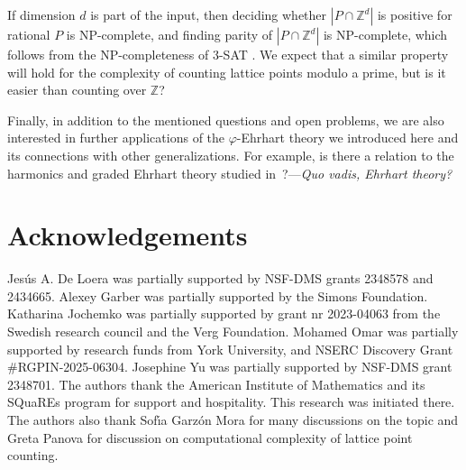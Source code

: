 \documentclass[12pt,reqno]{amsart}
\theoremstyle{definition}
\theoremstyle{remark}
\newcommand{\Z}{\mathbb{Z}}
\renewcommand{\phi}{\varphi}
\begin{document}
If dimension $d$ is part of the input, then deciding whether $|P\cap \Z^d|$ is positive for rational $P$ is NP-complete, and finding parity of $|P\cap \Z^d|$ is NP-complete, which follows from the NP-completeness of 3-SAT \cite{karp}. We expect that a similar property will hold for the complexity of counting lattice points modulo a prime, but is it easier than counting over $\mathbb{Z}$? 

Finally, in addition to the mentioned questions and open problems, we are also interested in further applications of the $\phi$-Ehrhart theory we introduced here and its connections with other generalizations. For example, is there a relation to the harmonics and graded Ehrhart theory studied in~\cite{reiner2024harmonicsgradedehrharttheory}?---\textit{Quo vadis, Ehrhart theory?}

\section{Acknowledgements}
Jes\'us A. De Loera was partially supported by NSF-DMS grants 2348578 and 2434665. Alexey Garber was partially supported by the Simons Foundation. Katharina Jochemko was partially supported by  grant nr 2023-04063 from 
the Swedish research council and the Verg Foundation. Mohamed Omar was partially supported by research funds from York University, and NSERC Discovery Grant \#RGPIN-2025-06304. Josephine Yu was partially supported by NSF-DMS grant 2348701. The authors thank the American Institute of Mathematics and its SQuaREs program for support and hospitality. This research was initiated there. 
The authors also thank Sof{\'\i}a Garz\'on Mora for many discussions on 
the topic and Greta Panova for discussion on computational complexity of lattice point counting.





\end{document}
